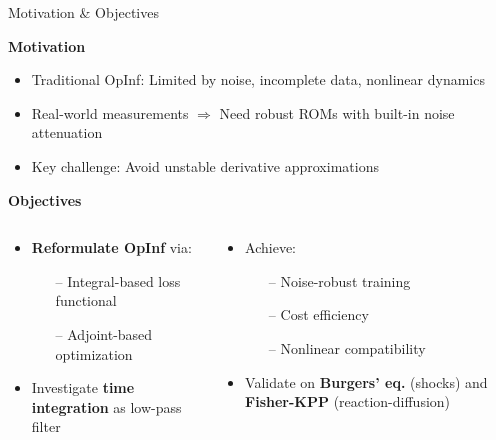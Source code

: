\begin{frame}{Motivation \& Objectives}

\textbf{Motivation}
\begin{itemize}
    \item Traditional OpInf: Limited by noise, incomplete data, nonlinear dynamics
    \item Real-world measurements $\Rightarrow$ Need robust ROMs with built-in noise attenuation
    \item Key challenge: Avoid unstable derivative approximations
\end{itemize}

\vspace{0.3cm}

\textbf{Objectives}
\begin{columns}[T]
\begin{column}{0.48\textwidth}
\begin{itemize}
    \item \textbf{Reformulate OpInf} via:
    \begin{itemize}
        \item[--] Integral-based loss functional
        \item[--] Adjoint-based optimization
    \end{itemize}
    \item Investigate \textbf{time integration} as low-pass filter
\end{itemize}
\end{column}
\begin{column}{0.48\textwidth}
\begin{itemize}
    \item Achieve:
    \begin{itemize}
        \item[--] Noise-robust training
        \item[--] Cost efficiency
        \item[--] Nonlinear compatibility
    \end{itemize}
    \item Validate on \textbf{Burgers' eq.} (shocks) and \textbf{Fisher-KPP} (reaction-diffusion)
\end{itemize}
\end{column}
\end{columns}

\end{frame}

